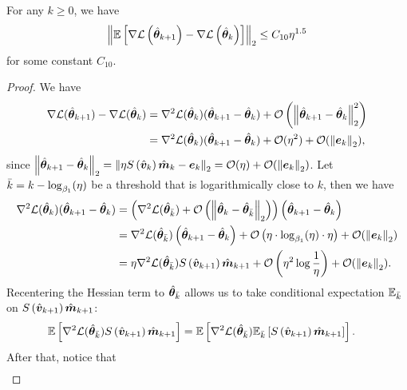 \begin{lemma}\label{E-G-closeness}
    For any $k \geq 0$, we have \begin{align*}
        \left\|\mathbb{E}\left[\nabla \mathcal{L}\left(\hat{{\bm{\theta}}}_{k+1}\right) - \nabla \mathcal{L}\left(\hat{{\bm{\theta}}}_{k}\right)\right]\right\|_2 \leq C_{10} \eta^{1.5}
    \end{align*}
    for some constant $C_{10}$.
\end{lemma}
\begin{proof}
    We have \begin{align*}
        \nabla\cL(\hat{\vtheta}_{k+1}) - \nabla\cL(\hat{\vtheta}_k) &= \nabla^2 \cL (\hat{\vtheta}_k) (\hat{\vtheta}_{k+1} - \hat{\vtheta}_k) + \O\left(\lnormtwo{\hat{\vtheta}_{k+1} - \hat{\vtheta}_k}^2\right) \\
        &= \nabla^2 \cL (\hat{\vtheta}_k) (\hat{\vtheta}_{k+1} - \hat{\vtheta}_k) + \O(\eta^2) + \O(\lnormtwo{\ve_{k}}),
    \end{align*}
    since $\lnormtwo{\hat{\vtheta}_{k+1} - \hat{\vtheta}_k} = \lnormtwo{\eta S\left(\hat{\vv}_k\right) \hat{\vm}_{k}-\ve_{k}} = \O(\eta)+ \O(\lnormtwo{\ve_{k}})$. Let $\Bar{k} = k - \log_{\beta_1}(\eta)$ be a threshold that is logarithmically close to $k$, then we have \begin{align*}
        \nabla^2 \cL (\hat{\vtheta}_k) (\hat{\vtheta}_{k+1} - \hat{\vtheta}_k) &= \left(\nabla^2 \cL (\hat{\vtheta}_{\Bar{k}}) + \O\left(\lnormtwo{\hat{\vtheta}_k - \hat{\vtheta}_{\Bar{k}}}\right)\right)\left(\hat{\vtheta}_{k+1} - \hat{\vtheta}_k\right) \\
        &= \nabla^2 \cL (\hat{\vtheta}_{\Bar{k}}) \left(\hat{\vtheta}_{k+1} - \hat{\vtheta}_k\right) + \O\left(\eta \cdot \log_{\beta_1}(\eta) \cdot \eta\right) + \O(\lnormtwo{\ve_{k}})\\
        &= \eta \nabla^2 \cL (\hat{\vtheta}_{\Bar{k}}) S\left(\hat{\vv}_{k+1}\right) \hat{\vm}_{k+1} + \O\left(\eta^2 \log \frac{1}{\eta}\right) + \O(\lnormtwo{\ve_{k}}).
    \end{align*}
    Recentering the Hessian term to $\hat{{\bm{\theta}}}_{\Bar{k}}$ allows us to take conditional expectation $\mathbb{E}_{\Bar{k}}$ on $S\left(\hat{{\bm{v}}}_{k+1}\right) \hat{{\bm{m}}}_{k+1}$: \begin{align*}
        \mathbb{E}\left[\nabla^2 \mathcal{L} (\hat{{\bm{\theta}}}_{\Bar{k}}) S\left(\hat{{\bm{v}}}_{k+1}\right) \hat{{\bm{m}}}_{k+1}\right] &= \mathbb{E}\left[\nabla^2 \mathcal{L} (\hat{{\bm{\theta}}}_{\Bar{k}}) \mathbb{E}_{\Bar{k}}\left[S\left(\hat{{\bm{v}}}_{k+1}\right) \hat{{\bm{m}}}_{k+1}\right]\right].
    \end{align*}
    After that, notice that \begin{align*}

\end{align*}
\end{proof}
